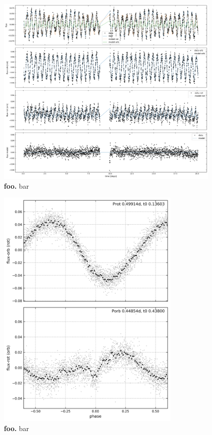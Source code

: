 \documentclass[12pt,twocolumn,tighten]{aastex62}
\begin{document}
\begin{figure}[t]
	\begin{center}
		\leavevmode
		\includegraphics[width=0.98\textwidth]{f1.png}
	\end{center}
	\vspace{-0.7cm}
	\caption{ {\bf foo.}
    bar
		\label{fig:splitsignal}
	}
\end{figure}

\begin{figure}[t]
	\begin{center}
		\leavevmode
		\includegraphics[width=0.8\textwidth]{f2.png}
	\end{center}
	\vspace{-0.7cm}
	\caption{ {\bf foo.}
    bar
		\label{fig:phasefold}
	}
\end{figure}
\end{document}
